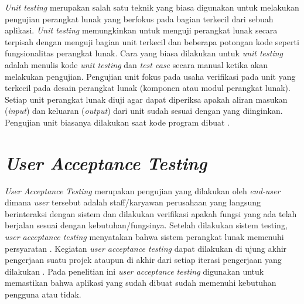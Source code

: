 \textit{Unit testing} merupakan salah satu teknik yang biasa digunakan untuk melakukan pengujian perangkat lunak yang berfokus pada bagian terkecil dari sebuah aplikasi. \textit{Unit testing} memungkinkan untuk menguji perangkat lunak secara terpisah dengan menguji bagian unit terkecil dan beberapa potongan kode seperti fungsionalitas perangkat lunak. Cara yang biasa dilakukan untuk \textit{unit testing} adalah menulis kode \textit{unit testing} dan \textit{test case} secara manual ketika akan melakukan pengujian. Pengujian unit fokus pada usaha verifikasi pada unit yang terkecil pada desain perangkat lunak (komponen atau modul perangkat lunak). Setiap unit perangkat lunak diuji agar dapat diperiksa apakah aliran masukan (\textit{input}) dan keluaran (\textit{output}) dari unit sudah sesuai dengan yang diinginkan. Pengujian unit biasanya dilakukan saat kode program dibuat \citep{ut2}.

\section{\textit{User Acceptance Testing}}
%
%


\textit{User Acceptance Testing} merupakan pengujian yang dilakukan oleh \textit{end-user} dimana \textit{user} tersebut adalah staff/karyawan perusahaan yang langsung berinteraksi dengan sistem dan dilakukan verifikasi apakah fungsi yang ada telah berjalan sesuai dengan kebutuhan/fungsinya. Setelah dilakukan sistem testing, \textit{user acceptance testing} menyatakan bahwa sistem perangkat lunak memenuhi persyaratan \citep{uat1}. Kegiatan \textit{user acceptance testing} dapat dilakukan di ujung akhir pengerjaan suatu projek ataupun di akhir dari setiap iterasi pengerjaan yang dilakukan \citep{uat}. Pada penelitian ini \textit{user acceptance testing} digunakan untuk memastikan bahwa aplikasi yang sudah dibuat sudah memenuhi kebutuhan pengguna atau tidak.

